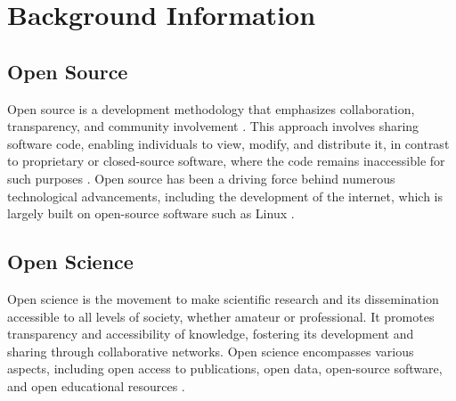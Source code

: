 \documentclass{IEEEtran}
\begin{document}






\section{Background Information}

\subsection{Open Source}
Open source is a development methodology that emphasizes collaboration, transparency, and community involvement \cite{dibona1999opensource}. This approach involves sharing software code, enabling individuals to view, modify, and distribute it, in contrast to proprietary or closed-source software, where the code remains inaccessible for such purposes \cite{dibona1999opensource}. Open source has been a driving force behind numerous technological advancements, including the development of the internet, which is largely built on open-source software such as Linux \cite{dibona1999opensource}.

\subsection{Open Science}
Open science is the movement to make scientific research and its dissemination accessible to all levels of society, whether amateur or professional. It promotes transparency and accessibility of knowledge, fostering its development and sharing through collaborative networks. Open science encompasses various aspects, including open access to publications, open data, open-source software, and open educational resources \cite{nielsen2011reinventing}.
\end{document}

